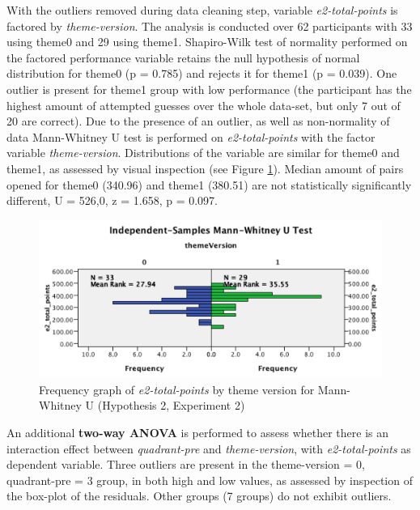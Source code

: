 	With the outliers removed during data cleaning step, variable \textit{e2-total-points} is factored by \textit{theme-version}. The analysis is conducted over 62 participants with 33 using theme0 and 29 using theme1.
	Shapiro-Wilk test of normality performed on the factored performance variable retains the null hypothesis of normal distribution for theme0 (p = 0.785) and rejects it for theme1 (p = 0.039).
	One outlier is present for theme1 group with low performance (the participant has the highest amount of attempted guesses over the whole data-set, but only 7 out of 20 are correct).
	Due to the presence of an outlier, as well as non-normality of data Mann-Whitney U test is performed on \textit{e2-total-points} with the factor variable \textit{theme-version}. Distributions of the variable are similar for theme0 and theme1, as assessed by visual inspection (see Figure \ref{fig:h2e2-mannwhitneyu}). Median amount of pairs opened for theme0 (340.96) and theme1 (380.51) are not statistically significantly different, U = 526,0, z = 1.658, p = 0.097.
	
	\begin{figure}[h]
		\centering
		\includegraphics[width=0.8\linewidth]{graphics/H2E2-MannWhitneyU}
		\caption{Frequency graph of \textit{e2-total-points} by theme version for Mann-Whitney U (Hypothesis 2, Experiment 2)}
		\label{fig:h2e2-mannwhitneyu}
	\end{figure}
	
	An additional \textbf{two-way ANOVA} is performed to assess whether there is an interaction effect between \textit{quadrant-pre} and \textit{theme-version}, with \textit{e2-total-points} as dependent variable. Three outliers are present in the theme-version = 0, quadrant-pre = 3 group, in both high and low values, as assessed by inspection of the box-plot of the residuals. Other groups (7 groups) do not exhibit outliers. 
	
